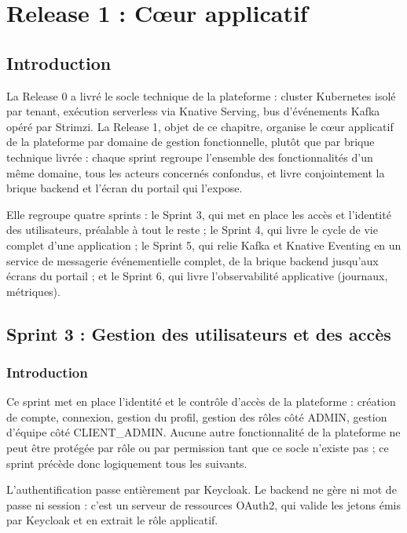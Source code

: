 \chapter{Release 1 : Cœur applicatif}

\section{Introduction}

La Release 0 a livré le socle technique de la plateforme : cluster Kubernetes isolé par tenant, exécution serverless via Knative Serving, bus d'événements Kafka opéré par Strimzi. La Release 1, objet de ce chapitre, organise le cœur applicatif de la plateforme par domaine de gestion fonctionnelle, plutôt que par brique technique livrée : chaque sprint regroupe l'ensemble des fonctionnalités d'un même domaine, tous les acteurs concernés confondus, et livre conjointement la brique backend et l'écran du portail qui l'expose.

Elle regroupe quatre sprints : le Sprint 3, qui met en place les accès et l'identité des utilisateurs, préalable à tout le reste ; le Sprint 4, qui livre le cycle de vie complet d'une application ; le Sprint 5, qui relie Kafka et Knative Eventing en un service de messagerie événementielle complet, de la brique backend jusqu'aux écrans du portail ; et le Sprint 6, qui livre l'observabilité applicative (journaux, métriques).

\section{Sprint 3 : Gestion des utilisateurs et des accès}

\subsection{Introduction}

Ce sprint met en place l'identité et le contrôle d'accès de la plateforme : création de compte, connexion, gestion du profil, gestion des rôles côté ADMIN, gestion d'équipe côté CLIENT\_ADMIN. Aucune autre fonctionnalité de la plateforme ne peut être protégée par rôle ou par permission tant que ce socle n'existe pas ; ce sprint précède donc logiquement tous les suivants.

L'authentification passe entièrement par Keycloak. Le backend ne gère ni mot de passe ni session : c'est un serveur de ressources OAuth2, qui valide les jetons émis par Keycloak et en extrait le rôle applicatif.


